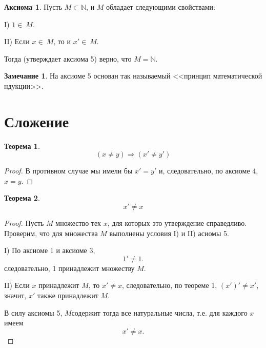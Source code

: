 \documentclass[12pt,oneside]{article}
\theoremstyle{definition}
\newtheorem{axiom}{Аксиома}
\newtheorem{theorem}{Теорема}
\newtheorem{remark}{Замечание}
\begin{document}
\begin{axiom}
Пусть $M\subset\mathbb{N}$, и $M$ обладает следующими свойствами: 

I) $1\in\ M$. 

II) Если $x\in\ M$, то и $x'\in\ M$. 

Тогда (утверждает аксиома 5) верно, что $M=\mathbb{N}$.
\end{axiom}

\begin{remark}
На аксиоме 5 основан так называемый <<принцип математической ндукции>>.
\end{remark}

\section{Сложение}

\begin{theorem}
$$(x\neq y)\Rightarrow (x'\neq y')$$
\begin{proof} 
В противном случае мы имели бы $x'=y'$  и, следовательно, по аксиоме 4, $x=y$.
\end{proof}
\end{theorem}

\begin{theorem}
$$x'\neq x$$
\begin{proof}
Пусть $M$ множество тех $x$, для которых это утверждение справедливо. Проверим, что для множества $M$ выполнены условия I) и II) асиомы 5.

I) По аксиоме 1 и аксиоме 3, $$1'\neq 1.$$ следовательно, 1 принадлежит множеству $M$.

II) Если $x$ принадлежит $M$, то $x'\neq x$, следовательно, по теореме 1, $(x')'\neq x'$, значит, $x'$ также принадлежит $M$.

	В силу аксиомы 5, $M$содержит тогда все натуральные числа, т.е. для каждого $x$ имеем $$x'\neq x.$$ 
\end{proof}
\end{theorem}
\end{document}
